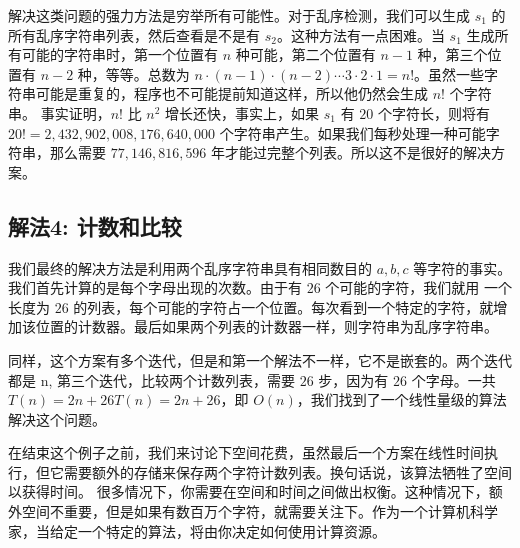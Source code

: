 解决这类问题的强力方法是穷举所有可能性。对于乱序检测，我们可以生成 $s_1$ 的所有乱序字符串列表，然后查看是不是有 $s_2$。这种方法有一点困难。当 $s_1$ 生成所有可能的字符串时，第一个位置有 $n$ 种可能，第二个位置有 $n-1$ 种，第三个位置有 $n-2$ 种，等等。总数为 $n\cdot(n−1)\cdot(n−2)\cdots 3\cdot 2\cdot 1=n!$。虽然一些字符串可能是重复的，程序也不可能提前知道这样，所以他仍然会生成 $n!$ 个字符串。
事实证明，$n!$ 比 $n^2$ 增长还快，事实上，如果 $s_1$ 有 $20$ 个字符长，则将有 $20! = 2,432,902,008,176,640,000$ 个字符串产生。如果我们每秒处理一种可能字符串，那么需要 $77,146,816,596$ 年才能过完整个列表。所以这不是很好的解决方案。


\subsection{解法4: 计数和比较}

我们最终的解决方法是利用两个乱序字符串具有相同数目的 $a, b, c$ 等字符的事实。我们首先计算的是每个字母出现的次数。由于有 $26$ 个可能的字符，我们就用 一个长度为 $26$ 的列表，每个可能的字符占一个位置。每次看到一个特定的字符，就增加该位置的计数器。最后如果两个列表的计数器一样，则字符串为乱序字符串。 

  

同样，这个方案有多个迭代，但是和第一个解法不一样，它不是嵌套的。两个迭代都是 n, 第三个迭代，比较两个计数列表，需要 $26$ 步，因为有 $26$ 个字母。一共 $T(n)=2n+26T(n)=2n+26$，即 $O(n)$，我们找到了一个线性量级的算法解决这个问题。


在结束这个例子之前，我们来讨论下空间花费，虽然最后一个方案在线性时间执行，但它需要额外的存储来保存两个字符计数列表。换句话说，该算法牺牲了空间以获得时间。
很多情况下，你需要在空间和时间之间做出权衡。这种情况下，额外空间不重要，但是如果有数百万个字符，就需要关注下。作为一个计算机科学家，当给定一个特定的算法，将由你决定如何使用计算资源。
